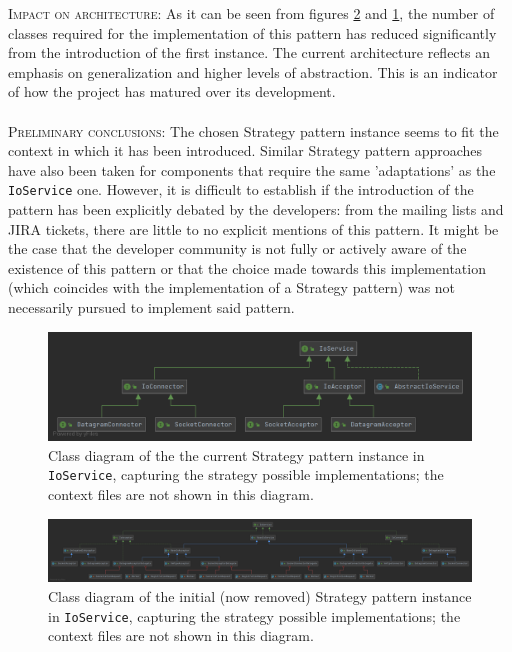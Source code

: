 \textsc{Impact on architecture}: As it can be seen from figures \ref{fig:strategy_removed} and \ref{fig:strategy_current}, the number of classes required for the implementation of this pattern has reduced significantly from the introduction of the first instance. The current architecture reflects an emphasis on generalization and higher levels of abstraction. This is an indicator of how the project has matured over its development. \\\\
\textsc{Preliminary conclusions}: The chosen Strategy pattern instance seems to fit the context in which it has been introduced. Similar Strategy pattern approaches have also been taken for components that require the same 'adaptations' as the \texttt{IoService} one. However, it is difficult to establish if the introduction of the pattern has been explicitly debated by the developers: from the mailing lists and JIRA tickets, there are little to no explicit mentions of this pattern. It might be the case that the developer community is not fully or actively aware of the existence of this pattern or that the choice made towards this implementation (which coincides with the implementation of a Strategy pattern) was not necessarily pursued to implement said pattern.  


\begin{figure}
    \centering
    \includegraphics[width = \textwidth ]{images/class_diagrams/strategy_current.png}
    \caption{Class diagram of the the current Strategy pattern instance in \texttt{IoService}, capturing the strategy possible implementations; the context files are not shown in this diagram.}
    \label{fig:strategy_current}
\end{figure}


\begin{landscape}
    \begin{figure}
        \centering
        \includegraphics[scale = 0.2 ]{images/class_diagrams/strategy_removed.png}
        \caption{Class diagram of the initial (now removed) Strategy pattern instance in \texttt{IoService}, capturing the strategy possible implementations; the context files are not shown in this diagram.}
        \label{fig:strategy_removed}
    \end{figure}
\end{landscape}








